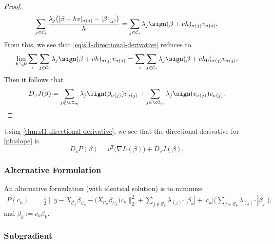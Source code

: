 \begin{proof}
\[    \sum_{j \in \mathcal{C}_i} \frac{\lambda_j\big(|\beta + hv|_{\sigma(j)} - |\beta|_{(j)}\big)}{h}
    = \sum_{j \in \mathcal{C}_i} \lambda_j\sign(\beta + vh)_{\sigma(j)}v_{\sigma(j)}.
  \]
  From this, we see that \eqref{eq:sl1-directional-derivative} reduces to
  \[
    \lim_{h \searrow 0} \sum_i \sum_{j \in \mathcal{C}_i} \lambda_j\sign(\beta + vh)_{\sigma(j)}v_{\sigma(j)}
    = \sum_i \sum_{j \in \mathcal{C}_i} \lambda_j\sign(\beta + vh_0)_{\sigma(j)}v_{\sigma(j)}.
  \]
  Then it follows that
  \begin{equation*}
    D_v J(\beta) = \sum_{j \notin \cC_m} \lambda_j \sign (\beta_{\sigma(j)}) v_{\sigma(j)}
    +
    \sum_{j \in \cC_m} \lambda_j \sign (v_{\sigma(j)}) v_{\sigma(j)}.
  \end{equation*}
\end{proof}

\begin{remark}
  Using \cref{thm:sl1-directional-derivative}, we see that
  the directional derivative for \eqref{pb:slope} is
  \[
    D_v P(\beta) = v^T \big(\nabla L(\beta)\big) + D_v J(\beta).
  \]
\end{remark}

\subsubsection{Alternative Formulation}

An alternative formulation (with identical solution) is to minimize
\[
  \begin{aligned}
    P(c_k) & = \frac{1}{2} \lVert y - X_{\bar{\mathcal{C}_k}} \beta_{\bar{\mathcal{C}_k}} - \big(X_{\mathcal{C}_k} \beta_{\mathcal{C}_k}\big)c_k  \rVert_2^2 + \sum_{j \notin {\mathcal{C}_k}} \lambda_{(j)^-}|\beta_k| + |c_k|\bigg(\sum_{j \in {\mathcal{C}_k}} \lambda_{(j)^- }|\beta_j|\bigg),
  \end{aligned}
\]
and \(\beta_k := c_k\beta_k\).


\subsubsection{Subgradient}

